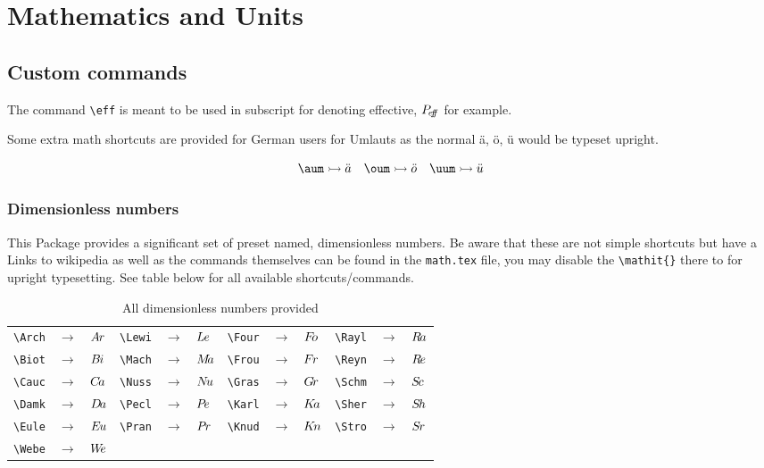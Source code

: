 \section{Mathematics and Units}


\begingroup \small
\subsection{Custom commands}

    \I

    The command \verb|\eff| is meant to be used in subscript for denoting effective, $P_{\kern-.1em e \kern-.20em f \kern-.30em f}$ for example.

    Some extra math shortcuts are provided for German users for Umlauts as the normal ä, ö, ü would be typeset upright.

    \[
        \verb|\aum| \rightarrowtail  \aum \quad
        \verb|\oum| \rightarrowtail  \oum \quad
        \verb|\uum| \rightarrowtail  \uum
    \]


    \subsubsection{Dimensionless numbers}
    This Package provides a significant set of preset named, dimensionless numbers. Be aware that these are not simple shortcuts but have a  Links to wikipedia as well as the commands themselves can be found in the \texttt{math.tex} file, you may disable the \verb|\mathit{}| there to for upright typesetting. See table below for all available shortcuts/commands.

    \begin{table}[H]
        \centering
        \caption{All dimensionless numbers provided}
        \begin{tabular}{lll|lll|lll|lll}
        \verb|\Arch| & $\rightarrow $ & $A\kern-.06em r$ & \verb|\Lewi| & $\rightarrow $ & $L\kern-.05em e$
            &\verb|\Four| & $\rightarrow $ & $F\kern-.20em o$ & \verb|\Rayl| & $\rightarrow $ & $R\kern-.10em a$\\
        \verb|\Biot| & $\rightarrow $ & $B\kern-.08em i$ & \verb|\Mach| & $\rightarrow $ & $M\kern-.20em a$
            &\verb|\Frou| & $\rightarrow $ & $F\kern-.07em r$ & \verb|\Reyn| & $\rightarrow $ & $R\kern-.10em e$\\
        \verb|\Cauc| & $\rightarrow $ & $C\kern-.13em a$ & \verb|\Nuss| & $\rightarrow $ & $N\kern-.15em u$
            &\verb|\Gras| & $\rightarrow $ & $G\kern-.12em r$ & \verb|\Schm| & $\rightarrow $ & $S\kern-.12em c$\\
        \verb|\Damk| & $\rightarrow $ & $D\kern-.12em a$ & \verb|\Pecl| & $\rightarrow $ & $P\kern-.15em e$
            &\verb|\Karl| & $\rightarrow $ & $K\kern-.15em a$ & \verb|\Sher| & $\rightarrow $ & $S\kern-.12em h$\\
        \verb|\Eule| & $\rightarrow $ & $E\kern-.09em u$ & \verb|\Pran| & $\rightarrow $ & $P\kern-.10em r$
            &\verb|\Knud| & $\rightarrow $ & $K\kern-.13em n$ & \verb|\Stro| & $\rightarrow $ & $S\kern-.09em r$\\
        \verb|\Webe| & $\rightarrow $ & $W\kern-.25em e$ &              &                &&&&&&&
        \end{tabular}
    \end{table}

